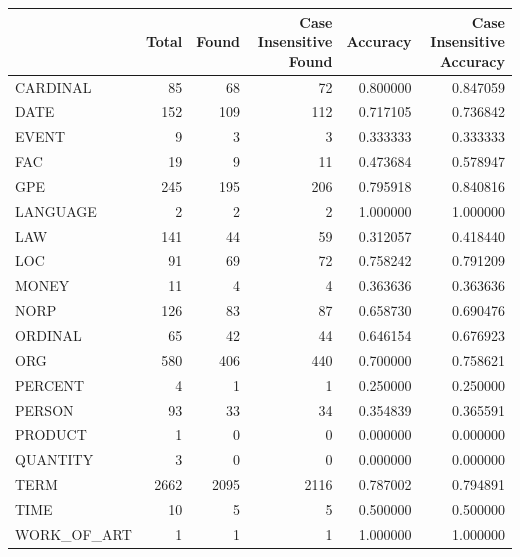 \begin{tabular}{lrrrrr}
\toprule
 & Total & Found & Case Insensitive Found & Accuracy & Case Insensitive Accuracy \\
\midrule
CARDINAL & 85 & 68 & 72 & 0.800000 & 0.847059 \\
DATE & 152 & 109 & 112 & 0.717105 & 0.736842 \\
EVENT & 9 & 3 & 3 & 0.333333 & 0.333333 \\
FAC & 19 & 9 & 11 & 0.473684 & 0.578947 \\
GPE & 245 & 195 & 206 & 0.795918 & 0.840816 \\
LANGUAGE & 2 & 2 & 2 & 1.000000 & 1.000000 \\
LAW & 141 & 44 & 59 & 0.312057 & 0.418440 \\
LOC & 91 & 69 & 72 & 0.758242 & 0.791209 \\
MONEY & 11 & 4 & 4 & 0.363636 & 0.363636 \\
NORP & 126 & 83 & 87 & 0.658730 & 0.690476 \\
ORDINAL & 65 & 42 & 44 & 0.646154 & 0.676923 \\
ORG & 580 & 406 & 440 & 0.700000 & 0.758621 \\
PERCENT & 4 & 1 & 1 & 0.250000 & 0.250000 \\
PERSON & 93 & 33 & 34 & 0.354839 & 0.365591 \\
PRODUCT & 1 & 0 & 0 & 0.000000 & 0.000000 \\
QUANTITY & 3 & 0 & 0 & 0.000000 & 0.000000 \\
TERM & 2662 & 2095 & 2116 & 0.787002 & 0.794891 \\
TIME & 10 & 5 & 5 & 0.500000 & 0.500000 \\
WORK_OF_ART & 1 & 1 & 1 & 1.000000 & 1.000000 \\
\bottomrule
\end{tabular}

